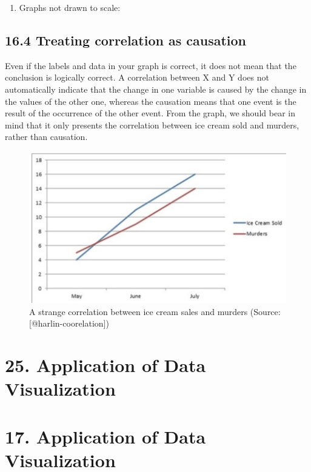 \documentclass[]{book}
\providecommand{\tightlist}{%
  \setlength{\itemsep}{0pt}\setlength{\parskip}{0pt}}
\theoremstyle{definition}
\theoremstyle{definition}
\theoremstyle{definition}
\theoremstyle{remark}
\begin{document}
\begin{enumerate}
\def\labelenumi{\alph{enumi})}
\setcounter{enumi}{1}
\tightlist
\item
  Graphs not drawn to scale:\citep{scaling_issues}
\end{enumerate}

\subsection{16.4 Treating correlation as
causation}\label{treating-correlation-as-causation}

Even if the labels and data in your graph is correct, it does not mean
that the conclusion is logically correct. A correlation between X and Y
does not automatically indicate that the change in one variable is
caused by the change in the values of the other one, whereas the
causation means that one event is the result of the occurrence of the
other event. From the graph, we should bear in mind that it only
presents the correlation between ice cream sold and murders, rather than
causation.

\begin{figure}
\includegraphics[width=0.7\linewidth]{images/harlin-ice-cream} \caption{A strange correlation between ice cream sales and murders (Source: [@harlin-coorelation])}\label{fig:harlin-ice-cream}
\end{figure}

\section{25. Application of Data
Visualization}\label{application-of-data-visualization}

\citep{outliar}

\section{17. Application of Data
Visualization}\label{application-of-data-visualization-1}
\end{document}
